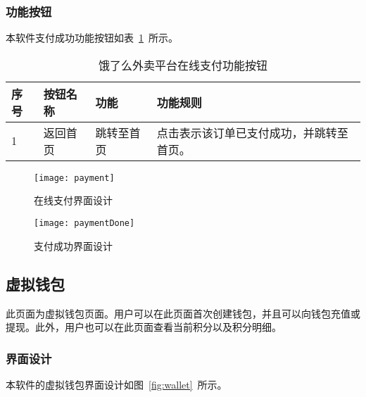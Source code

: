 \subsubsection{功能按钮}
本软件支付成功功能按钮如表~\ref{tab:table7}~所示。
\begin{table}[htbp]
    \caption{饿了么外卖平台在线支付功能按钮}\label{tab:table7}
    \vspace{0.5em}\wuhao
    \begin{tabularx}{\textwidth}{lllX}
    \toprule[1.5pt]
    序号 & 按钮名称 & 功能 & 功能规则 \\ 
    \midrule[1pt]
    1 & 返回首页 & 跳转至首页 & 点击表示该订单已支付成功，并跳转至首页。 \\
\bottomrule[1.5pt]
\end{tabularx}
\vspace{\baselineskip}
\end{table}
\begin{figure}[htbp]
    \centering
    \begin{minipage}{0.4\textwidth}
    \centering
    \texttt{[image: payment]}
    \caption{在线支付界面设计}\label{fig:payment}
    \end{minipage}
    \begin{minipage}{0.4\textwidth}
    \centering
    \texttt{[image: paymentDone]}
    \caption{支付成功界面设计}\label{fig:paymentDone}
    \end{minipage}
    \vspace{\baselineskip}
\end{figure}

\subsection{虚拟钱包}
此页面为虚拟钱包页面。用户可以在此页面首次创建钱包，并且可以向钱包充值或提现。此外，用户也可以在此页面查看当前积分以及积分明细。
\subsubsection{界面设计}
本软件的虚拟钱包界面设计如图~\ref{fig:wallet}~所示。
